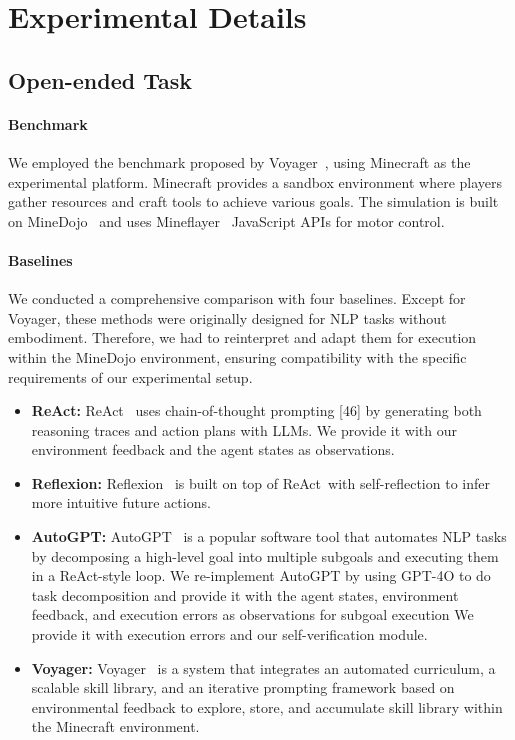 \section{Experimental Details}
\label{app:apexp}
\subsection{Open-ended Task}
\label{subsec:open}
\paragraph{Benchmark} We employed the benchmark proposed by Voyager~\citep{wang2023voyager}, using Minecraft as the experimental platform. Minecraft provides a sandbox environment where players gather resources and craft tools to achieve various goals. The simulation is built on MineDojo~\citep{fan2022minedojo} and uses Mineflayer~\citep{PrismarineJS2013} JavaScript APIs for motor control. 

\paragraph{Baselines}
We conducted a comprehensive comparison with four baselines. Except for Voyager, these methods were originally designed for NLP tasks without embodiment. Therefore, we had to reinterpret and adapt them for execution within the MineDojo environment, ensuring compatibility with the specific requirements of our experimental setup.
\begin{itemize}
    \item \textbf{ReAct:} ReAct~\citep{yao2022react} uses chain-of-thought prompting [46] by generating both reasoning traces and action
plans with LLMs. We provide it with our environment feedback and the agent states as observations.
    \item \textbf{Reflexion:} Reflexion~\citep{shinn2023reflexion} is built on top of ReAct~\citep{yao2022react}with self-reflection to infer more intuitive future actions.
    \item \textbf{AutoGPT:} AutoGPT~\citep{richardssignificant} is a popular software tool that automates NLP tasks by decomposing a high-level
goal into multiple subgoals and executing them in a ReAct-style loop. We re-implement AutoGPT by using GPT-4O to do task decomposition and provide it with the agent states, environment feedback,
and execution errors as observations for subgoal execution
We provide it with execution errors and our self-verification module.
    \item \textbf{Voyager:} Voyager~\citep{wang2023voyager} is a system that integrates an automated curriculum, a scalable skill library, and an iterative prompting framework based on environmental feedback to explore, store, and accumulate skill library within the Minecraft environment.
\end{itemize}


